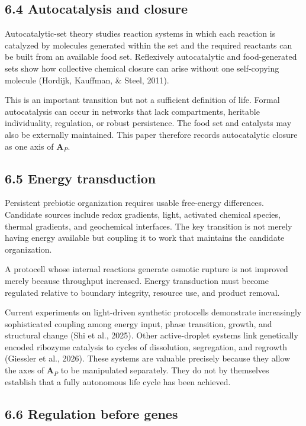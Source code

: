 \documentclass[
  11pt,
]{article}
\begin{document}
\subsection{6.4 Autocatalysis and
closure}\label{autocatalysis-and-closure}

Autocatalytic-set theory studies reaction systems in which each reaction
is catalyzed by molecules generated within the set and the required
reactants can be built from an available food set. Reflexively
autocatalytic and food-generated sets show how collective chemical
closure can arise without one self-copying molecule (Hordijk, Kauffman,
\& Steel, 2011).

This is an important transition but not a sufficient definition of life.
Formal autocatalysis can occur in networks that lack compartments,
heritable individuality, regulation, or robust persistence. The food set
and catalysts may also be externally maintained. This paper therefore
records autocatalytic closure as one axis of \(\mathbf A_P\).

\subsection{6.5 Energy transduction}\label{energy-transduction}

Persistent prebiotic organization requires usable free-energy
differences. Candidate sources include redox gradients, light, activated
chemical species, thermal gradients, and geochemical interfaces. The key
transition is not merely having energy available but coupling it to work
that maintains the candidate organization.

A protocell whose internal reactions generate osmotic rupture is not
improved merely because throughput increased. Energy transduction must
become regulated relative to boundary integrity, resource use, and
product removal.

Current experiments on light-driven synthetic protocells demonstrate
increasingly sophisticated coupling among energy input, phase
transition, growth, and structural change (Shi et al., 2025). Other
active-droplet systems link genetically encoded ribozyme catalysis to
cycles of dissolution, segregation, and regrowth (Giessler et al.,
2026). These systems are valuable precisely because they allow the axes
of \(\mathbf A_P\) to be manipulated separately. They do not by
themselves establish that a fully autonomous life cycle has been
achieved.

\subsection{6.6 Regulation before genes}\label{regulation-before-genes}
\end{document}
